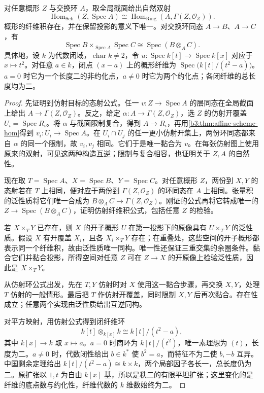 \begin{proposition}\label{b3:prop:scheme-fiber-products-exist}\label{b3:prop:scheme-hom-affine-target}\label{b3:prop:scheme-ramified-fibers}
	对任意概形 \(Z\) 与交换环 \(A\)，取全局截面给出自然双射
	\[
		\operatorname{Hom}_{\mathrm{Sch}}(Z,\operatorname{Spec}A) \cong\operatorname{Hom}_{\mathrm{Ring}}(A,\Gamma(Z,\mathcal O_Z)).
	\]
	概形的纤维积存在，并在保留投影的意义下唯一。对交换环同态 \(A\rightarrow B\)、\(A\rightarrow C\)，有
	\[
		\operatorname{Spec}B\times_{\operatorname{Spec}A}\operatorname{Spec}C \cong\operatorname{Spec}(B\otimes_AC).
	\]
	具体地，设 \(k\) 为代数闭域，\(\operatorname{char}k\ne2\)，令 \(u:\operatorname{Spec}k[t]\to\operatorname{Spec}k[x]\) 对应于 \(x\mapsto t^2\)。对任意 \(a\in k\)，闭点 \((x-a)\) 上的概形纤维为 \(\operatorname{Spec}\bigl(k[t]/(t^2-a)\bigr)\)。\(a=0\) 时它为一个长度二的非约化点，\(a\ne0\) 时它为两个约化点；各闭纤维的总长度均为二。
\end{proposition}
\begin{proof}
	先证明到仿射目标的态射公式。任一 \(v:Z\to\operatorname{Spec}A\) 的层同态在全局截面上给出 \(A\to\Gamma(Z,\mathcal O_Z)\)。反之，给定 \(\alpha:A\to\Gamma(Z,\mathcal O_Z)\)，选 \(Z\) 的仿射开覆盖 \(U_i=\operatorname{Spec}R_i\)。将 \(\alpha\) 与截面限制复合，得到 \(A\to R_i\)，再用\cref{b3:thm:affine-scheme-hom}得到 \(v_i:U_i\to\operatorname{Spec}A\)。在 \(U_i\cap U_j\) 的任一更小仿射开集上，两份环同态都来自 \(\alpha\) 的同一个限制，故 \(v_i,v_j\) 相同。它们于是唯一黏合为 \(v\)。在每张仿射图上使用原来的双射，可见这两种构造互逆；限制与复合相容，也证明关于 \(Z,A\) 的自然性。

	现在取 \(T=\operatorname{Spec}A\)、\(X=\operatorname{Spec}B\)、\(Y=\operatorname{Spec}C\)。对任意概形 \(Z\)，两份到 \(X,Y\) 的态射若在 \(T\) 上相同，便对应于两份到 \(\Gamma(Z,\mathcal O_Z)\) 的环同态在 \(A\) 上相同。张量积的泛性质将它们唯一合成为 \(B\otimes_AC\to\Gamma(Z,\mathcal O_Z)\)。刚证的公式再将它转成唯一的 \(Z\to\operatorname{Spec}(B\otimes_AC)\)，证明仿射纤维积公式，包括任意 \(Z\) 的检验。

	若 \(X\times_TY\) 已存在，则 \(X\) 的开子概形 \(U\) 在第一投影下的原像具有 \(U\times_TY\) 的泛性质。假设 \(X\) 有开覆盖 \(X_i\)，且各 \(X_i\times_TY\) 存在；在重叠处，这些空间的开子概形都表示同一个纤维积，故由泛性质唯一同构。唯一性还保证三重交集的余圈条件。黏合它们并黏合投影，所得空间对任意 \(Z\) 可在 \(Z\rightarrow X\) 的开原像上检验泛性质，因此是 \(X\times_TY\)。

	从仿射环公式出发，先在 \(T,Y\) 仿射时对 \(X\) 使用这一黏合步骤，再交换 \(X,Y\)，处理 \(T\) 仿射的一般情形。最后把 \(T\) 作仿射开覆盖，同时限制 \(X,Y\) 后再次黏合。存在性成立；任意两个实现由泛性质给出互逆同构。

	对平方映射，用仿射公式得到闭纤维环
	\[
		k[t]\otimes_{k[x]}k\cong k[t]/(t^2-a),
	\]
	其中 \(k[x]\to k\) 取 \(x\mapsto a\)。\(a=0\) 时商环为 \(k[t]/(t^2)\)，唯一素理想为 \((t)\)，长度为二。\(a\ne0\) 时，代数闭性给出 \(b\in k^*\) 使 \(b^2=a\)，而特征不为二使 \(b,-b\) 互异。中国剩余定理给出 \(k[t]/(t^2-a)\cong k\times k\)，两个局部因子各长一，总长度仍为二。原扩张以 \(1,t\) 为自由 \(k[x]\) 基，所以是秩二的有限平坦扩张；这里变化的是纤维的底点数与约化性，纤维代数的 \(k\) 维数始终为二。
\end{proof}

